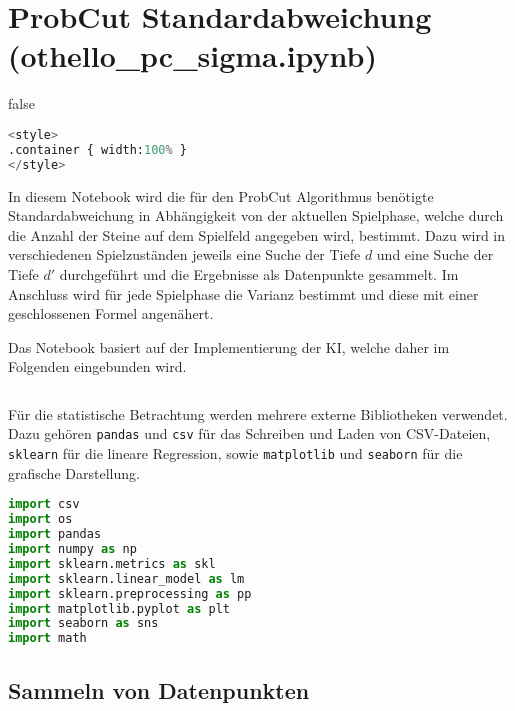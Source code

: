 \hypertarget{probcut-standardabweichung-othello_pc_sigma.ipynb}{%
\section{ProbCut Standardabweichung
(othello\_pc\_sigma.ipynb)}\label{probcut-standardabweichung-othello_pc_sigma.ipynb}}

\label{sec:pcsigma} \ifx false

\begin{lstlisting}[language=Python]
%%HTML
<style>
.container { width:100% }
</style>
\end{lstlisting}

\fi In diesem Notebook wird die für den ProbCut Algorithmus benötigte
Standardabweichung in Abhängigkeit von der aktuellen Spielphase, welche
durch die Anzahl der Steine auf dem Spielfeld angegeben wird, bestimmt.
Dazu wird in verschiedenen Spielzuständen jeweils eine Suche der Tiefe
\(d\) und eine Suche der Tiefe \(d'\) durchgeführt und die Ergebnisse
als Datenpunkte gesammelt. Im Anschluss wird für jede Spielphase die
Varianz bestimmt und diese mit einer geschlossenen Formel angenähert.

Das Notebook basiert auf der Implementierung der \ac{KI}, welche daher im
Folgenden eingebunden wird.

\begin{lstlisting}[language=Python]
%run othello_ai.ipynb
\end{lstlisting}

Für die statistische Betrachtung werden mehrere externe Bibliotheken
verwendet. Dazu gehören \passthrough{\lstinline!pandas!} und
\passthrough{\lstinline!csv!} für das Schreiben und Laden von
CSV-Dateien, \passthrough{\lstinline!sklearn!} für die lineare
Regression, sowie \passthrough{\lstinline!matplotlib!} und
\passthrough{\lstinline!seaborn!} für die grafische Darstellung.

\begin{lstlisting}[language=Python]
import csv
import os
import pandas
import numpy as np
import sklearn.metrics as skl
import sklearn.linear_model as lm
import sklearn.preprocessing as pp
import matplotlib.pyplot as plt
import seaborn as sns
import math
\end{lstlisting}

\hypertarget{sammeln-von-datenpunkten}{%
\subsection{Sammeln von Datenpunkten}\label{sammeln-von-datenpunkten}}

